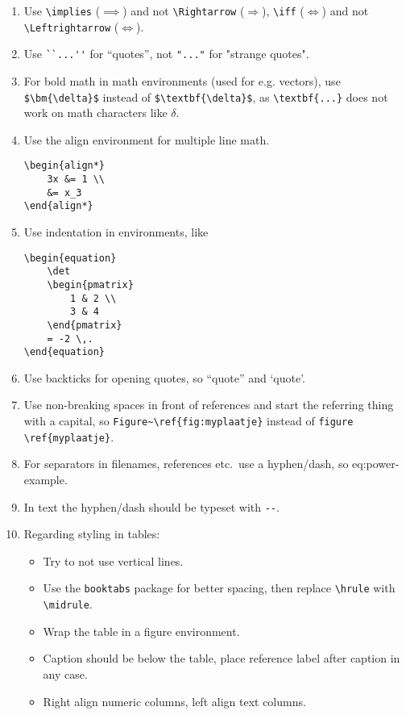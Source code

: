 \documentclass[11pt]{exam}
\begin{document}
\begin{enumerate}
        \item Use \verb|\implies| ($\implies$) and not \verb|\Rightarrow| ($\Rightarrow$), \verb|\iff| ($\iff$) and not \verb|\Leftrightarrow| ($\Leftrightarrow$).

        \item Use \verb|``...''| for ``quotes'', not \verb|"..."| for "strange quotes".

        \item For bold math in math environments (used for e.g. vectors), use \verb|$\bm{\delta}$| instead of \verb|$\textbf{\delta}$|, as        \verb|\textbf{...}| does not work on math characters like $\delta$.

        \item Use the align environment for multiple line math.
            \begin{lstlisting}
\begin{align*}
    3x &= 1 \\
    &= x_3
\end{align*}
            \end{lstlisting}

        \item Use indentation in environments, like
            \begin{lstlisting}
\begin{equation}
    \det
    \begin{pmatrix}
        1 & 2 \\
        3 & 4
    \end{pmatrix}
    = -2 \,.
\end{equation}
            \end{lstlisting}
        \item Use backticks for opening quotes, so ``quote'' and `quote'.
        \item Use non-breaking spaces in front of references and start the referring thing with a capital, so \verb|Figure~\ref{fig:myplaatje}| instead of \verb|figure \ref{myplaatje}|.
        \item For separators in filenames, references etc.\ use a hyphen/dash, so eq:power-example.
        \item In text the hyphen/dash should be typeset with \verb|--|.
        \item Regarding styling in tables:
        \begin{itemize}
            \item Try to not use vertical lines.
            \item Use the \verb|booktabs| package for better spacing, then replace \verb|\hrule| with \verb|\midrule|.
            \item Wrap the table in a figure environment.
            \item Caption should be below the table, place reference label after caption in any case.
            \item Right align numeric columns, left align text columns.
        \end{itemize}
    \end{enumerate}
\end{document}
